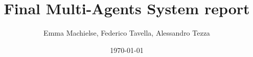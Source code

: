 \documentclass[a4paper]{article}
\title{Final Multi-Agents System report}
\author{Emma Machielse, Federico Tavella, Alessandro Tezza}
\date{\today}
\begin{document}
\maketitle


















\newpage
\onecolumn



\end{document}
